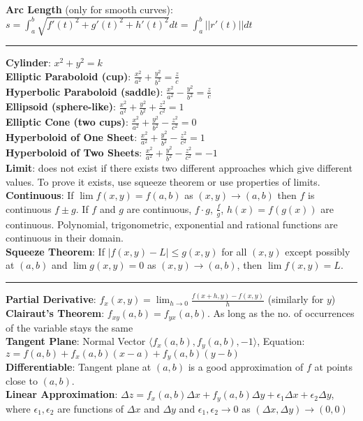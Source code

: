 \documentclass{article}
\begin{document}
{\begin{multicols*}{3}
\textbf{Arc Length} (only for smooth curves): $s=\int_a^b\sqrt{f'(t)^2+g'(t)^2+h'(t)^2}dt=\int_a^b||r'(t)||dt$ \\
\rule{193pt}{0.2pt}
\textbf{Cylinder}: $x^2+y^2=k$\\
\textbf{Elliptic Paraboloid (cup)}: $\frac{x^2}{a^2}+\frac{y^2}{b^2}=\frac{z}{c}$\\
\textbf{Hyperbolic Paraboloid (saddle)}: $\frac{x^2}{a^2}-\frac{y^2}{b^2}=\frac{z}{c}$\\ 
\textbf{Ellipsoid (sphere-like)}: $\frac{x^2}{a^2}+\frac{y^2}{b^2}+\frac{z^2}{c^2}=1$\\
\textbf{Elliptic Cone (two cups)}: $\frac{x^2}{a^2}+\frac{y^2}{b^2}-\frac{z^2}{c^2}=0$\\
\textbf{Hyperboloid of One Sheet}: $\frac{x^2}{a^2}+\frac{y^2}{b^2}-\frac{z^2}{c^2}=1$\\
\textbf{Hyperboloid of Two Sheets}: $\frac{x^2}{a^2}+\frac{y^2}{b^2}-\frac{z^2}{c^2}=-1$\\
\textbf{Limit}: does not exist if there exists two different approaches which give different values. To prove it exists, use squeeze theorem or use properties of limits. \\
\textbf{Continuous}: If $\lim f(x,y)=f(a,b)$ as $(x,y)\to(a,b)$ then $f$ is continuous $f\pm g$. If $f$ and $g$ are continuous, $f\cdot g$, $\frac{f}{g}$, $h(x)=f(g(x))$ are continuous. Polynomial, trigonometric, exponential and rational functions are continuous in their domain.\\
\textbf{Squeeze Theorem}: If $|f(x,y)-L|\leq g(x,y)$ for all $(x,y)$ except possibly at $(a,b)$ and $\lim g(x,y)=0$ as $(x,y)\to(a,b)$, then $\lim f(x,y)=L$. \\
\rule{193pt}{0.2pt}
\textbf{Partial Derivative}: $f_x(x,y)=\lim_{h\to 0}\frac{f(x+h,y)-f(x,y)}{h}$ (similarly for $y$) \\
\textbf{Clairaut's Theorem}: $f_{xy}(a,b)=f_{yx}(a,b)$. As long as the no. of occurrences of the variable stays the same \\
\textbf{Tangent Plane}: Normal Vector $\langle f_x(a,b),f_y(a,b),-1\rangle$, Equation: $z=f(a,b)+f_x(a,b)(x-a)+f_y(a,b)(y-b)$ \\
\textbf{Differentiable}: Tangent plane at $(a,b)$ is a good approximation of $f$ at points close to $(a,b)$. \\
\textbf{Linear Approximation}: $\Delta z=f_x(a,b)\Delta x+f_y(a,b)\Delta y+\epsilon_1\Delta x+\epsilon_2 \Delta y$, where $\epsilon_1,\epsilon_2$ are functions of $\Delta x$ and $\Delta y$ and $\epsilon_1,\epsilon_2\to 0$ as $(\Delta x, \Delta y)\to(0,0)$  \\

\end{multicols*}}
\end{document}
